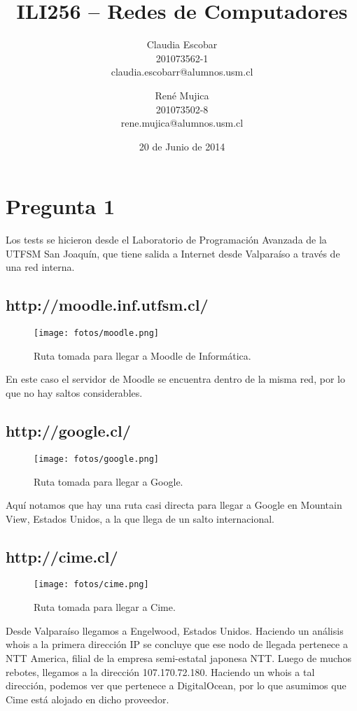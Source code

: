 \documentclass[letterpaper,10pt,onecolumn,titlepage]{article}
\title{ILI256 -- Redes de Computadores}
\author{Claudia Escobar\\201073562-1\\claudia.escobarr@alumnos.usm.cl\and René Mujica\\201073502-8\\rene.mujica@alumnos.usm.cl}
\date{20 de Junio de 2014}
\begin{document}
  \maketitle

  \section{Pregunta 1}
  Los tests se hicieron desde el Laboratorio de Programación Avanzada de la UTFSM San Joaquín, que tiene salida a Internet desde Valparaíso a través de una red interna.

  \subsection{http://moodle.inf.utfsm.cl/}
  \begin{figure}[H]
    \caption{Ruta tomada para llegar a Moodle de Informática.}
    \centering
    \texttt{[image: fotos/moodle.png]}
    \label{fig:moodle}
  \end{figure}
  En este caso el servidor de Moodle se encuentra dentro de la misma red, por lo que no hay saltos considerables.

  \subsection{http://google.cl/}
  \begin{figure}[H]
    \caption{Ruta tomada para llegar a Google.}
    \centering
    \texttt{[image: fotos/google.png]}
    \label{fig:google}
  \end{figure}
  Aquí notamos que hay una ruta casi directa para llegar a Google en Mountain View, Estados Unidos, a la que llega de un salto internacional.

  \subsection{http://cime.cl/}
  \begin{figure}[H]
    \caption{Ruta tomada para llegar a Cime.}
    \centering
    \texttt{[image: fotos/cime.png]}
    \label{fig:cime}
  \end{figure}
  Desde Valparaíso llegamos a Engelwood, Estados Unidos. Haciendo un análisis whois a la primera dirección IP se concluye que ese nodo de llegada pertenece a NTT America, filial de la empresa semi-estatal japonesa NTT. Luego de muchos rebotes, llegamos a la dirección 107.170.72.180. Haciendo un whois a tal dirección, podemos ver que pertenece a DigitalOcean, por lo que asumimos que Cime está alojado en dicho proveedor.
\end{document}
